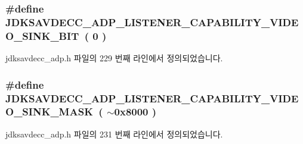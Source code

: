 \subsubsection[{\texorpdfstring{J\+D\+K\+S\+A\+V\+D\+E\+C\+C\+\_\+\+A\+D\+P\+\_\+\+L\+I\+S\+T\+E\+N\+E\+R\+\_\+\+C\+A\+P\+A\+B\+I\+L\+I\+T\+Y\+\_\+\+V\+I\+D\+E\+O\+\_\+\+S\+I\+N\+K\+\_\+\+B\+IT}{JDKSAVDECC_ADP_LISTENER_CAPABILITY_VIDEO_SINK_BIT}}]{\setlength{\rightskip}{0pt plus 5cm}\#define J\+D\+K\+S\+A\+V\+D\+E\+C\+C\+\_\+\+A\+D\+P\+\_\+\+L\+I\+S\+T\+E\+N\+E\+R\+\_\+\+C\+A\+P\+A\+B\+I\+L\+I\+T\+Y\+\_\+\+V\+I\+D\+E\+O\+\_\+\+S\+I\+N\+K\+\_\+\+B\+IT~( 0 )}\hypertarget{group__adp__listener__capability_ga961d214be29c513d30615bd9ca84a8b4}{}\label{group__adp__listener__capability_ga961d214be29c513d30615bd9ca84a8b4}


jdksavdecc\+\_\+adp.\+h 파일의 229 번째 라인에서 정의되었습니다.

\subsubsection[{\texorpdfstring{J\+D\+K\+S\+A\+V\+D\+E\+C\+C\+\_\+\+A\+D\+P\+\_\+\+L\+I\+S\+T\+E\+N\+E\+R\+\_\+\+C\+A\+P\+A\+B\+I\+L\+I\+T\+Y\+\_\+\+V\+I\+D\+E\+O\+\_\+\+S\+I\+N\+K\+\_\+\+M\+A\+SK}{JDKSAVDECC_ADP_LISTENER_CAPABILITY_VIDEO_SINK_MASK}}]{\setlength{\rightskip}{0pt plus 5cm}\#define J\+D\+K\+S\+A\+V\+D\+E\+C\+C\+\_\+\+A\+D\+P\+\_\+\+L\+I\+S\+T\+E\+N\+E\+R\+\_\+\+C\+A\+P\+A\+B\+I\+L\+I\+T\+Y\+\_\+\+V\+I\+D\+E\+O\+\_\+\+S\+I\+N\+K\+\_\+\+M\+A\+SK~( $\sim$0x8000 )}\hypertarget{group__adp__listener__capability_gaddefcbfb3932dba0f2553ed9adc74db6}{}\label{group__adp__listener__capability_gaddefcbfb3932dba0f2553ed9adc74db6}


jdksavdecc\+\_\+adp.\+h 파일의 231 번째 라인에서 정의되었습니다.

